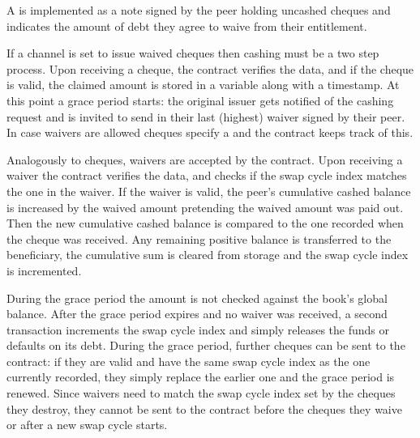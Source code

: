 A  is implemented as a note signed by the peer holding uncashed cheques %
 and indicates the amount of debt they agree to waive from their entitlement.

If a channel is set to issue waived cheques then cashing must be a two step process.
Upon receiving a cheque, the contract verifies the data, and %
if the cheque is valid, the claimed amount is stored in a variable along with a timestamp. At this point a grace period starts: the original issuer gets notified of the cashing request and is invited to send in their last (highest) waiver signed by their peer. In case waivers are allowed cheques specify a  and the contract keeps track of this.

Analogously to cheques, waivers are accepted by the contract. %
Upon receiving a waiver the contract verifies the data, and checks if the swap cycle index matches the one in the waiver.
If the waiver is valid, the peer's cumulative cashed balance is increased by the waived amount pretending the waived amount was paid out. Then the new cumulative cashed balance is compared to the one recorded when the cheque was received. Any remaining positive balance is transferred to the beneficiary, the cumulative sum is cleared from storage and the swap cycle index is incremented.


During the grace period the amount is not checked against the book's global balance.
After the grace period expires and no waiver was received, a second transaction
increments the swap cycle index and simply releases the funds or defaults on its debt.
During the grace period, further cheques can be sent to the contract: if they are valid and have the same swap cycle index as the one currently recorded, they simply replace the earlier one and the grace period is renewed.
Since waivers need to match the swap cycle index set by the cheques they destroy, they cannot be sent to the contract before the cheques they waive or after a new swap cycle starts.

